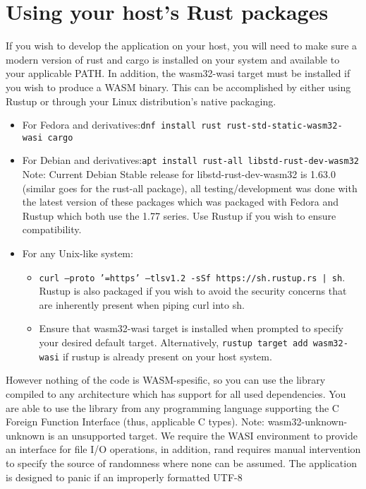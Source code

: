 \section{Using your host's Rust packages}
If you wish to develop the application on your host, you will need to make sure a modern version of rust and cargo is installed on your system and available to your applicable PATH. In addition, the wasm32-wasi target must be installed if you wish to produce a WASM binary. This can be accomplished by either using Rustup or through your Linux distribution's native packaging.
\begin{itemize}
    \item For Fedora and derivatives:\texttt{dnf install rust rust-std-static-wasm32-wasi cargo}
    \item For Debian and derivatives:\texttt{apt install rust-all libstd-rust-dev-wasm32} \break Note: Current Debian Stable release for libstd-rust-dev-wasm32 is 1.63.0 (similar goes for the rust-all package), all testing/development was done with the latest version of these packages which was packaged with Fedora and Rustup which both use the 1.77 series. Use Rustup if you wish to ensure compatibility.
    \item For any Unix-like system:
    \begin{itemize}
        \item \texttt{curl --proto '=https' --tlsv1.2 -sSf https://sh.rustup.rs | sh}. Rustup is also packaged if you wish to avoid the security concerns that are inherently present when piping curl into sh.
        \item Ensure that wasm32-wasi target is installed when prompted to specify your desired default target. Alternatively, \texttt{rustup target add wasm32-wasi} if rustup is already present on your host system. 
    \end{itemize}
\end{itemize}
However nothing of the code is WASM-spesific, so you can use the library compiled to any architecture which has support for all used dependencies. You are able to use the library from any programming language supporting the C Foreign Function Interface (thus, applicable C types). Note: wasm32-unknown-unknown is an unsupported target. We require the WASI environment to provide an interface for file I/O operations, in addition, rand requires manual intervention to specify the source of randomness where none can be assumed. The application is designed to panic if an improperly formatted UTF-8  

